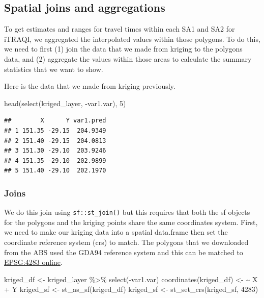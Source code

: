 \documentclass[
]{book}
\newenvironment{Shaded}{\begin{snugshade}}{\end{snugshade}}
\newcommand{\DecValTok}[1]{\textcolor[rgb]{0.00,0.00,0.81}{#1}}
\newcommand{\ErrorTok}[1]{\textcolor[rgb]{0.64,0.00,0.00}{\textbf{#1}}}
\newcommand{\FunctionTok}[1]{\textcolor[rgb]{0.00,0.00,0.00}{#1}}
\newcommand{\NormalTok}[1]{#1}
\newcommand{\OtherTok}[1]{\textcolor[rgb]{0.56,0.35,0.01}{#1}}
\newcommand{\SpecialCharTok}[1]{\textcolor[rgb]{0.00,0.00,0.00}{#1}}
\begin{document}
\hypertarget{spatial-joins-and-aggregations}{%
\subsection{Spatial joins and aggregations}\label{spatial-joins-and-aggregations}}

To get estimates and ranges for travel times within each SA1 and SA2 for iTRAQI, we aggregated the interpolated values within those polygons. To do this, we need to first (1) join the data that we made from kriging to the polygons data, and (2) aggregate the values within those areas to calculate the summary statistics that we want to show.

Here is the data that we made from kriging previously.

\begin{Shaded}
\begin{Highlighting}[]
\FunctionTok{head}\NormalTok{(}\FunctionTok{select}\NormalTok{(kriged\_layer, }\SpecialCharTok{{-}}\NormalTok{var1.var), }\DecValTok{5}\NormalTok{)}
\end{Highlighting}
\end{Shaded}

\begin{verbatim}
##        X      Y var1.pred
## 1 151.35 -29.15  204.9349
## 2 151.40 -29.15  204.0813
## 3 151.30 -29.10  203.9246
## 4 151.35 -29.10  202.9899
## 5 151.40 -29.10  202.1970
\end{verbatim}

\hypertarget{joins}{%
\subsubsection{Joins}\label{joins}}

We do this join using \texttt{sf::st\_join()} but this requires that both the sf objects for the polygons and the kriging points share the same coordinates system. First, we need to make our kriging data into a spatial data.frame then set the coordinate reference system (crs) to match. The polygons that we downloaded from the ABS used the GDA94 reference system and this can be matched to \href{https://epsg.io/4283}{EPSG:4283 online}.

\begin{Shaded}
\begin{Highlighting}[]
\NormalTok{kriged\_df }\OtherTok{\textless{}{-}}\NormalTok{ kriged\_layer }\SpecialCharTok{\%\textgreater{}\%} \FunctionTok{select}\NormalTok{(}\SpecialCharTok{{-}}\NormalTok{var1.var)}
\FunctionTok{coordinates}\NormalTok{(kriged\_df) }\OtherTok{\textless{}{-}} \ErrorTok{\textasciitilde{}}\NormalTok{ X }\SpecialCharTok{+}\NormalTok{ Y}
\NormalTok{kriged\_sf }\OtherTok{\textless{}{-}} \FunctionTok{st\_as\_sf}\NormalTok{(kriged\_df)}
\NormalTok{kriged\_sf }\OtherTok{\textless{}{-}} \FunctionTok{st\_set\_crs}\NormalTok{(kriged\_sf, }\DecValTok{4283}\NormalTok{)}
\end{Highlighting}
\end{Shaded}
\end{document}
